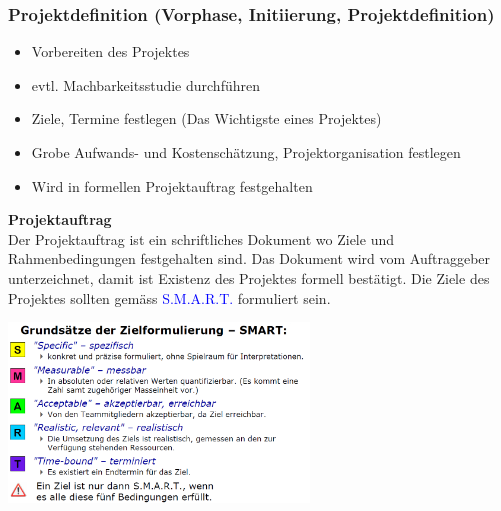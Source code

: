 \subsubsection{Projektdefinition (Vorphase, Initiierung, Projektdefinition)}
\begin{itemize}
	\item Vorbereiten des Projektes
	\item evtl. Machbarkeitsstudie durchführen
	\item Ziele, Termine festlegen (Das Wichtigste eines Projektes)
	\item Grobe Aufwands- und Kostenschätzung, Projektorganisation festlegen
	\item Wird in formellen Projektauftrag festgehalten
\end{itemize}
	\begin{minipage}{11cm}
		\textbf{Projektauftrag} \\
		Der Projektauftrag ist ein schriftliches Dokument wo Ziele und Rahmenbedingungen festgehalten sind. Das Dokument wird vom Auftraggeber unterzeichnet, damit ist Existenz des Projektes formell bestätigt. \newline Die Ziele des Projektes sollten gemäss \textcolor{blue}{S.M.A.R.T.} formuliert sein. 
	\end{minipage}
	\begin{minipage}{8cm}
		\includegraphics[width=8cm]{images/pmstart.png}
	\end{minipage}
	
